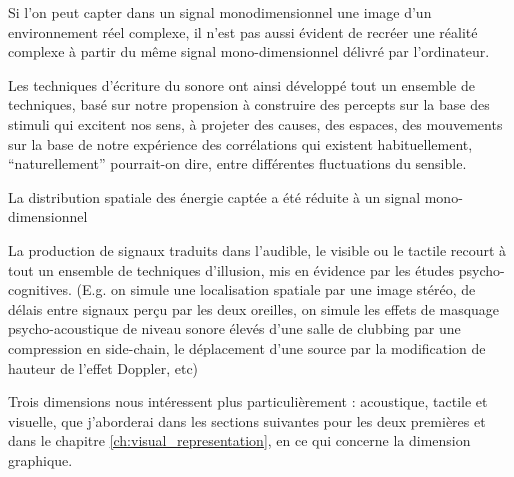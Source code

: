 Si l'on peut capter dans un signal monodimensionnel une image d'un environnement réel complexe, il n'est pas aussi évident de recréer une réalité complexe à partir du même signal mono-dimensionnel délivré par l'ordinateur.

Les techniques d'écriture du sonore ont ainsi développé tout un ensemble de techniques, basé sur notre propension à construire des percepts sur la base des stimuli qui excitent nos sens, à projeter des causes, des espaces, des mouvements sur la base de notre expérience des corrélations qui existent habituellement, ``naturellement'' pourrait-on dire, entre différentes fluctuations du sensible.

La distribution spatiale des énergie captée a été réduite à un signal mono-dimensionnel

La production de signaux traduits dans l'audible, le visible ou le tactile recourt à tout un ensemble de techniques d'illusion, mis en évidence par les études psycho-cognitives. (E.g. on simule une localisation spatiale par une image stéréo, de délais entre signaux perçu par les deux oreilles, on simule les effets de masquage psycho-acoustique de niveau sonore élevés d'une salle de clubbing par une compression en side-chain, le déplacement d'une source par la modification de hauteur de l'effet Doppler, etc)

Trois dimensions nous intéressent plus particulièrement : acoustique, tactile et visuelle, que j'aborderai dans les sections suivantes pour les deux premières et dans le chapitre \ref{ch:visual_representation}, en ce qui concerne la dimension graphique.